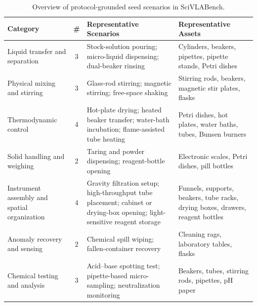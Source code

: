 \begin{table}[t]
  \centering
  \caption{Overview of protocol-grounded seed scenarios in SciVLABench.}
  \label{tab:seed-scenarios}
  \small
  \setlength{\tabcolsep}{5pt}
  \renewcommand{\arraystretch}{1.15}
  \begin{tabular}{p{3.4cm} c p{5.1cm} p{5.1cm}}
    \toprule
    \textbf{Category} & \textbf{\#} & \textbf{Representative Scenarios} & \textbf{Representative Assets} \\
    \midrule
    Liquid transfer and separation
    & 3
    & Stock-solution pouring; micro-liquid dispensing; dual-beaker rinsing
    & Cylinders, beakers, pipettes, pipette stands, Petri dishes \\

    Physical mixing and stirring
    & 3
    & Glass-rod stirring; magnetic stirring; free-space shaking
    & Stirring rods, beakers, magnetic stir plates, flasks \\

    Thermodynamic control
    & 4
    & Hot-plate drying; heated beaker transfer; water-bath incubation; flame-assisted tube heating
    & Petri dishes, hot plates, water baths, tubes, Bunsen burners \\

    Solid handling and weighing
    & 2
    & Taring and powder dispensing; reagent-bottle opening
    & Electronic scales, Petri dishes, pill bottles \\

    Instrument assembly and spatial organization
    & 4
    & Gravity filtration setup; high-throughput tube placement; cabinet or drying-box opening; light-sensitive reagent storage
    & Funnels, supports, beakers, tube racks, drying boxes, drawers, reagent bottles \\

    Anomaly recovery and sensing
    & 2
    & Chemical spill wiping; fallen-container recovery
    & Cleaning rags, laboratory tables, flasks \\

    Chemical testing and analysis
    & 3
    & Acid--base spotting test; pipette-based micro-sampling; neutralization monitoring
    & Beakers, tubes, stirring rods, pipettes, pH paper \\
    \bottomrule
  \end{tabular}
\end{table}
